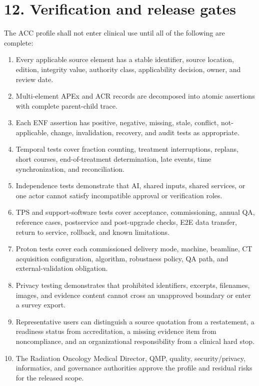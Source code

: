 \documentclass[11pt,letterpaper]{article}
\begin{document}
\section{12. Verification and release gates}

The ACC profile shall not enter clinical use until all of the following are complete:

\begin{enumerate}
\item Every applicable source element has a stable identifier, source location, edition, integrity value, authority class, applicability decision, owner, and review date.
\item Multi-element APEx and ACR records are decomposed into atomic assertions with complete parent-child trace.
\item Each ENF assertion has positive, negative, missing, stale, conflict, not-applicable, change, invalidation, recovery, and audit tests as appropriate.
\item Temporal tests cover fraction counting, treatment interruptions, replans, short courses, end-of-treatment determination, late events, time synchronization, and reconciliation.
\item Independence tests demonstrate that AI, shared inputs, shared services, or one actor cannot satisfy incompatible approval or verification roles.
\item TPS and support-software tests cover acceptance, commissioning, annual QA, reference cases, postservice and post-upgrade checks, E2E data transfer, return to service, rollback, and known limitations.
\item Proton tests cover each commissioned delivery mode, machine, beamline, CT acquisition configuration, algorithm, robustness policy, QA path, and external-validation obligation.
\item Privacy testing demonstrates that prohibited identifiers, excerpts, filenames, images, and evidence content cannot cross an unapproved boundary or enter a survey export.
\item Representative users can distinguish a source quotation from a restatement, a readiness status from accreditation, a missing evidence item from noncompliance, and an organizational responsibility from a clinical hard stop.
\item The Radiation Oncology Medical Director, QMP, quality, security/privacy, informatics, and governance authorities approve the profile and residual risks for the released scope.
\end{enumerate}
\end{document}
